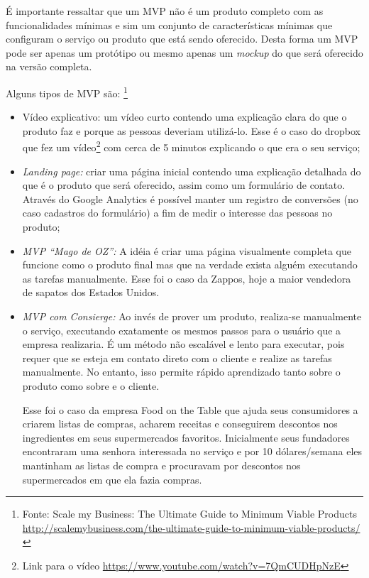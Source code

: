     \par É importante ressaltar que um MVP não é um produto completo com as funcionalidades mínimas e sim um conjunto de características mínimas que configuram o serviço ou produto que está sendo oferecido. Desta forma um MVP pode ser apenas um protótipo ou mesmo apenas um \emph{mockup} do que será oferecido na versão completa.
    \par Alguns tipos de MVP são: \footnote{ Fonte: Scale my Business: The Ultimate Guide to Minimum Viable Products  \url{http://scalemybusiness.com/the-ultimate-guide-to-minimum-viable-products/}}
\begin{itemize}
\item Vídeo explicativo: um vídeo curto contendo uma explicação clara do que o produto faz e porque as pessoas deveriam utilizá-lo. Esse é o caso do dropbox que fez um vídeo\footnote{Link para o vídeo  \url{https://www.youtube.com/watch?v=7QmCUDHpNzE}} com cerca de 5 minutos explicando o que era o seu serviço;
\item \emph{Landing page:}
criar uma página inicial contendo uma explicação detalhada do que é o produto que será oferecido, assim como um formulário de contato. Através do Google Analytics é possível manter um registro de conversões (no caso cadastros do formulário) a fim de medir o interesse das pessoas no produto;
\item \emph{MVP ``Mago de OZ'':}
A idéia é criar uma página visualmente completa que funcione como o produto final mas que na verdade exista alguém executando as tarefas manualmente. Esse foi o caso da Zappos, hoje a maior vendedora de sapatos dos Estados Unidos.
\item \emph{ MVP com Consierge:}
Ao invés de prover um produto, realiza-se manualmente o serviço, executando exatamente os mesmos passos para o usuário que a empresa realizaria. É um método não escalável e lento para executar, pois requer que se esteja em contato direto com o cliente e realize as tarefas manualmente. No entanto, isso permite rápido aprendizado tanto sobre o produto como sobre e o cliente.
\par Esse foi o caso da empresa Food on the Table que ajuda seus consumidores a criarem listas de compras, acharem receitas e conseguirem descontos nos ingredientes em seus supermercados favoritos. Inicialmente seus fundadores encontraram uma senhora interessada no serviço e por 10 dólares/semana eles mantinham as listas de compra e procuravam por descontos nos supermercados em que ela fazia compras.
\end{itemize}

